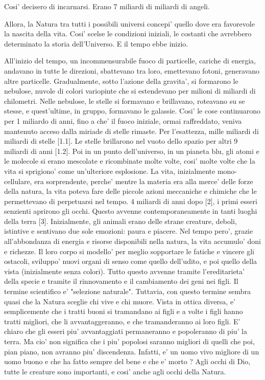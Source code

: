 Cosi' decisero di incarnarsi. Erano 7 miliardi di miliardi di angeli.

Allora, la Natura tra tutti i possibili universi concepi' quello dove era favorevole la nascita della vita. Cosi' scelse le condizioni iniziali, le costanti che avrebbero determinato la storia dell'Universo. E il tempo ebbe inizio.

All'inizio del tempo, un incommensurabile fuoco di particelle, cariche di energia, andavano in tutte le direzioni, sbattevano tra loro, emettevano fotoni, generavano altre particelle.
Gradualmente, sotto l'azione della gravita', si formarono le nebulose, nuvole di colori variopinte che si estendevano per milioni di miliardi di chilometri.
Nelle nebulose, le stelle si formavano e brillavano, roteavano su se stesse, e quest'ultime, in gruppo, formavano le galassie.
  Cosi' le cose continuarono per 1 miliardo di anni, fino a che' il fuoco iniziale, ormai raffreddato, veniva mantenuto acceso dalla miriade di stelle rimaste. Per l'esattezza, mille miliardi di miliardi di stelle [1.1]. 
  Le stelle brillarono nel vuoto dello spazio per altri 9 miliardi di anni [1.2]. Poi in un punto dell'universo, in un pianeta blu, gli atomi e le molecole si erano mescolate e ricombinate molte volte, cosi' molte volte che la vita si sprigiono' come un'ulteriore esplosione. La vita, inizialmente mono-cellulare, era sorprendente, perche' mentre la materia era alla merce' delle forze della natura, la vita poteva fare delle piccole azioni meccaniche e chimiche che le permettevano di perpetuarsi nel tempo.
 4 miliardi di anni dopo [2], i primi esseri senzienti aprirono gli occhi. Questo avvenne contemporaneamente in tanti luoghi della terra [3]. Inizialmente, gli animali erano delle strane creature, deboli, istintive e sentivano due sole emozioni: paura e piacere. Nel tempo pero', grazie all'abbondanza di energia e risorse disponibili nella natura, la vita accumulo' doni e richezze. Il loro corpo si modello' per meglio sopportare le fatiche e vincere gli ostacoli, sviluppo' nuovi organi di senso come quello dell'udito, e poi quello della vista (inizialmente senza colori). Tutto questo avvenne tramite l'ereditarieta' della specie e tramite il rinnovamento e il cambiamento dei geni nei figli.
Il termine scientifico e' "selezione naturale". Tuttavia, con questo termine sembra quasi che la Natura sceglie chi vive e chi muore. Vista in ottica diversa, e' semplicemente che i tratti buoni si tramandano ai figli e a volte i figli hanno tratti migliori, che li avvantaggeranno, e che tramanderanno ai loro figli. E' chiaro che gli esseri piu' avvantaggiati permaneranno e popoleranno di piu' la terra. Ma cio' non significa che i piu' popolosi saranno migliori di quelli che poi, pian piano, non avranno piu' discendenza. Infatti, e' un uomo vivo migliore di un uomo buono e che ha fatto sempre del bene e che e' morto ? Agli occhi di Dio, tutte le creature sono importanti, e cosi' anche agli occhi della Natura.

